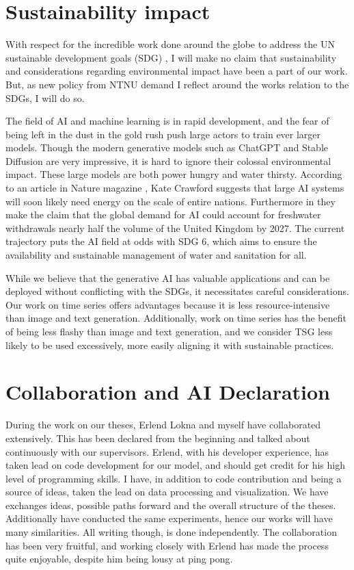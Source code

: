 \documentclass[../../thesis.tex]{subfiles}
\begin{document}
\section{Sustainability impact}

With respect for the incredible work done around the globe to address the UN sustainable development goals (SDG) \cite{Agenda2023}, I will make no claim that sustainability and considerations regarding environmental impact have been a part of our work. But, as new policy from NTNU demand I reflect around the works relation to the SDGs, I will do so.\newline 

The field of AI and machine learning is in rapid development, and the fear of being left in the dust in the gold rush push large actors to train ever larger models. Though the modern generative models such as ChatGPT and Stable Diffusion are very impressive, it is hard to ignore their colossal environmental impact. These large models are both power hungry and water thirsty. According to an article in Nature magazine \cite{AI_energy}, Kate Crawford suggests that large AI systems will soon likely need energy on the scale of entire nations. Furthermore in \cite{li2023making} they make the claim that the global demand for AI could account for freshwater withdrawals nearly half the volume of the United Kingdom by 2027. The current trajectory puts the AI field at odds with SDG 6, which aims to ensure the availability and sustainable management of water and sanitation for all.\newline

While we believe that the generative AI has valuable applications and can be deployed without conflicting with the SDGs, it necessitates careful considerations. Our work on time series offers advantages because it is less resource-intensive than image and text generation. Additionally, work on time series has the benefit of being less flashy than image and text generation, and we consider TSG less likely to be used excessively, more easily aligning it with sustainable practices.

\section{Collaboration and AI Declaration}

During the work on our theses, Erlend Lokna and myself have collaborated extensively. This has been declared from the beginning and talked about continuously with our supervisors. Erlend, with his developer experience, has taken lead on code development for our model, and should get credit for his high level of programming skills. I have, in addition to code contribution and being a source of ideas, taken the lead on data processing and visualization. We have exchanges ideas, possible paths forward and the overall structure of the theses. Additionally have conducted the same experiments, hence our works will have many similarities. All writing though, is done independently. The collaboration has been very fruitful, and working closely with Erlend has made the process quite enjoyable, despite him being lousy at ping pong. \newline
\end{document}
